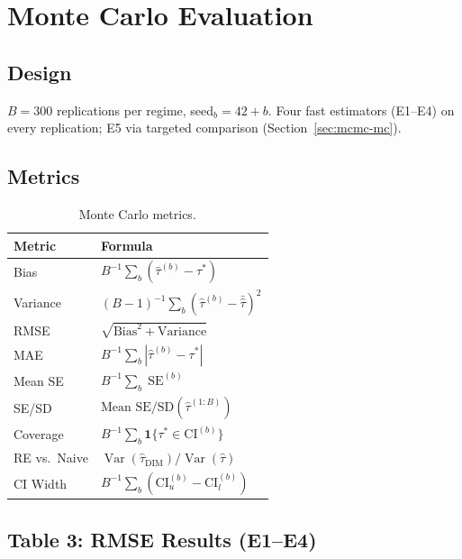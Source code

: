 \documentclass[11pt,letterpaper]{article}
\newcommand{\Var}{\operatorname{Var}}
\newcommand{\SE}{\operatorname{SE}}
\newcommand{\tauhat}{\hat{\tau}}
\newcommand{\taustar}{\tau^{*}}
\newcommand{\DIM}{\text{DIM}}
\begin{document}
\section{Monte Carlo Evaluation}\label{sec:mc}

\subsection{Design}

$B = 300$ replications per regime, seed$_b = 42 + b$.
Four fast estimators (E1--E4) on every replication; E5 via targeted
comparison (Section~\ref{sec:mcmc-mc}).

\subsection{Metrics}

\begin{table}[htbp]
\centering\small
\caption{Monte Carlo metrics.}
\begin{tabular}{@{}ll@{}}
\toprule
Metric & Formula \\
\midrule
Bias        & $B^{-1}\sum_b (\tauhat^{(b)} - \taustar)$ \\[4pt]
Variance    & $(B-1)^{-1}\sum_b (\tauhat^{(b)} - \bar{\tauhat})^2$ \\[4pt]
RMSE        & $\sqrt{\text{Bias}^2 + \text{Variance}}$ \\[4pt]
MAE         & $B^{-1}\sum_b |\tauhat^{(b)} - \taustar|$ \\[4pt]
Mean SE     & $B^{-1}\sum_b \SE^{(b)}$ \\[4pt]
SE/SD       & $\text{Mean SE} / \text{SD}(\tauhat^{(1:B)})$ \\[4pt]
Coverage    & $B^{-1}\sum_b \mathbf{1}\{\taustar \in \text{CI}^{(b)}\}$ \\[4pt]
RE vs.~Naive & $\Var(\tauhat_{\DIM}) / \Var(\tauhat)$ \\[4pt]
CI Width    & $B^{-1}\sum_b (\text{CI}_u^{(b)} - \text{CI}_l^{(b)})$ \\
\bottomrule
\end{tabular}
\end{table}


\subsection{Table 3: RMSE Results (E1--E4)}
\end{document}
